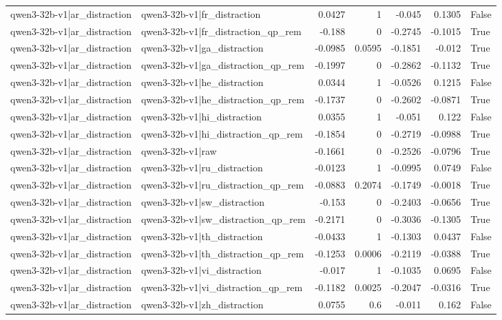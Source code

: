 \begin{table}
\begin{tabular}{l l r r r r l}
qwen3-32b-v1|ar_distraction & qwen3-32b-v1|fr_distraction & 0.0427 & 1 & -0.045 & 0.1305 & False \\
qwen3-32b-v1|ar_distraction & qwen3-32b-v1|fr_distraction_qp_rem & -0.188 & 0 & -0.2745 & -0.1015 & True \\
qwen3-32b-v1|ar_distraction & qwen3-32b-v1|ga_distraction & -0.0985 & 0.0595 & -0.1851 & -0.012 & True \\
qwen3-32b-v1|ar_distraction & qwen3-32b-v1|ga_distraction_qp_rem & -0.1997 & 0 & -0.2862 & -0.1132 & True \\
qwen3-32b-v1|ar_distraction & qwen3-32b-v1|he_distraction & 0.0344 & 1 & -0.0526 & 0.1215 & False \\
qwen3-32b-v1|ar_distraction & qwen3-32b-v1|he_distraction_qp_rem & -0.1737 & 0 & -0.2602 & -0.0871 & True \\
qwen3-32b-v1|ar_distraction & qwen3-32b-v1|hi_distraction & 0.0355 & 1 & -0.051 & 0.122 & False \\
qwen3-32b-v1|ar_distraction & qwen3-32b-v1|hi_distraction_qp_rem & -0.1854 & 0 & -0.2719 & -0.0988 & True \\
qwen3-32b-v1|ar_distraction & qwen3-32b-v1|raw & -0.1661 & 0 & -0.2526 & -0.0796 & True \\
qwen3-32b-v1|ar_distraction & qwen3-32b-v1|ru_distraction & -0.0123 & 1 & -0.0995 & 0.0749 & False \\
qwen3-32b-v1|ar_distraction & qwen3-32b-v1|ru_distraction_qp_rem & -0.0883 & 0.2074 & -0.1749 & -0.0018 & True \\
qwen3-32b-v1|ar_distraction & qwen3-32b-v1|sw_distraction & -0.153 & 0 & -0.2403 & -0.0656 & True \\
qwen3-32b-v1|ar_distraction & qwen3-32b-v1|sw_distraction_qp_rem & -0.2171 & 0 & -0.3036 & -0.1305 & True \\
qwen3-32b-v1|ar_distraction & qwen3-32b-v1|th_distraction & -0.0433 & 1 & -0.1303 & 0.0437 & False \\
qwen3-32b-v1|ar_distraction & qwen3-32b-v1|th_distraction_qp_rem & -0.1253 & 0.0006 & -0.2119 & -0.0388 & True \\
qwen3-32b-v1|ar_distraction & qwen3-32b-v1|vi_distraction & -0.017 & 1 & -0.1035 & 0.0695 & False \\
qwen3-32b-v1|ar_distraction & qwen3-32b-v1|vi_distraction_qp_rem & -0.1182 & 0.0025 & -0.2047 & -0.0316 & True \\
qwen3-32b-v1|ar_distraction & qwen3-32b-v1|zh_distraction & 0.0755 & 0.6 & -0.011 & 0.162 & False \\

\end{tabular}
\end{table}
